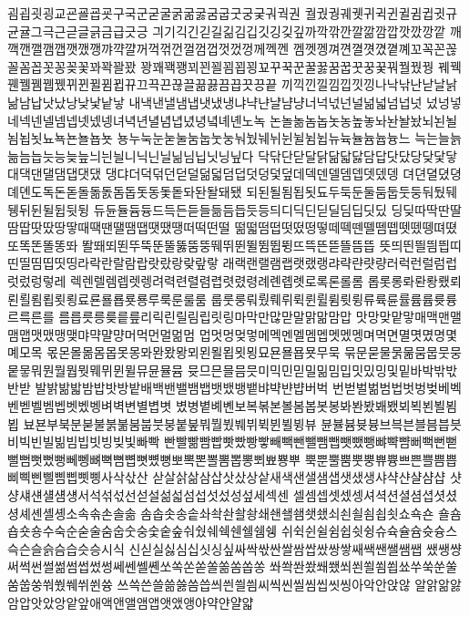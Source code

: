 굄굅굇굉교굔굘굡굣구국군굳굴굵굶굻굼굽굿궁궂궈궉권
궐궜궝궤궷귀귁귄귈귐귑귓규균귤그극근귿글긁금급긋긍
긔기긱긴긷길긺김깁깃깅깆깊까깍깎깐깔깖깜깝깟깠깡깥
깨깩깬깰깸깹깻깼깽꺄꺅꺌꺼꺽꺾껀껄껌껍껏껐껑께껙껜
껨껫껭껴껸껼꼇꼈꼍꼐꼬꼭꼰꼲꼴꼼꼽꼿꽁꽂꽃꽈꽉꽐꽜
꽝꽤꽥꽹꾀꾄꾈꾐꾑꾕꾜꾸꾹꾼꿀꿇꿈꿉꿋꿍꿎꿔꿜꿨꿩
꿰꿱꿴꿸뀀뀁뀄뀌뀐뀔뀜뀝뀨끄끅끈끊끌끎끓끔끕끗끙끝
끼끽낀낄낌낍낏낑나낙낚난낟날낡낢남납낫났낭낮낯낱낳
내낵낸낼냄냅냇냈냉냐냑냔냘냠냥너넉넋넌널넒넓넘넙넛
넜넝넣네넥넨넬넴넵넷넸넹녀녁년녈념녑녔녕녘녜녠노녹
논놀놂놈놉놋농높놓놔놘놜놨뇌뇐뇔뇜뇝뇟뇨뇩뇬뇰뇹뇻
뇽누눅눈눋눌눔눕눗눙눠눴눼뉘뉜뉠뉨뉩뉴뉵뉼늄늅늉느
늑는늘늙늚늠늡늣능늦늪늬늰늴니닉닌닐닒님닙닛닝닢다
닥닦단닫달닭닮닯닳담답닷닸당닺닻닿대댁댄댈댐댑댓댔
댕댜더덕덖던덛덜덞덟덤덥덧덩덫덮데덱덴델뎀뎁뎃뎄뎅
뎌뎐뎔뎠뎡뎨뎬도독돈돋돌돎돐돔돕돗동돛돝돠돤돨돼됐
되된될됨됩됫됴두둑둔둘둠둡둣둥둬뒀뒈뒝뒤뒨뒬뒵뒷뒹
듀듄듈듐듕드득든듣들듦듬듭듯등듸디딕딘딛딜딤딥딧딨
딩딪따딱딴딸땀땁땃땄땅땋때땍땐땔땜땝땟땠땡떠떡떤떨
떪떫떰떱떳떴떵떻떼떽뗀뗄뗌뗍뗏뗐뗑뗘뗬또똑똔똘똥똬
똴뙈뙤뙨뚜뚝뚠뚤뚫뚬뚱뛔뛰뛴뛸뜀뜁뜅뜨뜩뜬뜯뜰뜸뜹
뜻띄띈띌띔띕띠띤띨띰띱띳띵라락란랄람랍랏랐랑랒랖랗
래랙랜랠램랩랫랬랭랴략랸럇량러럭런럴럼럽럿렀렁렇레
렉렌렐렘렙렛렝려력련렬렴렵렷렸령례롄롑롓로록론롤롬
롭롯롱롸롼뢍뢨뢰뢴뢸룀룁룃룅료룐룔룝룟룡루룩룬룰룸
룹룻룽뤄뤘뤠뤼뤽륀륄륌륏륑류륙륜률륨륩륫륭르륵른를
름릅릇릉릊릍릎리릭린릴림립릿링마막만많맏말맑맒맘맙
맛망맞맡맣매맥맨맬맴맵맷맸맹맺먀먁먈먕머먹먼멀멂멈
멉멋멍멎멓메멕멘멜멤멥멧멨멩며멱면멸몃몄명몇몌모목
몫몬몰몲몸몹못몽뫄뫈뫘뫙뫼묀묄묍묏묑묘묜묠묩묫무묵
묶문묻물묽묾뭄뭅뭇뭉뭍뭏뭐뭔뭘뭡뭣뭬뮈뮌뮐뮤뮨뮬뮴
뮷므믄믈믐믓미믹민믿밀밂밈밉밋밌밍및밑바박밖밗반받
발밝밞밟밤밥밧방밭배백밴밸뱀뱁뱃뱄뱅뱉뱌뱍뱐뱝버벅
번벋벌벎범법벗벙벚베벡벤벧벨벰벱벳벴벵벼벽변별볍볏
볐병볕볘볜보복볶본볼봄봅봇봉봐봔봤봬뵀뵈뵉뵌뵐뵘뵙
뵤뵨부북분붇불붉붊붐붑붓붕붙붚붜붤붰붸뷔뷕뷘뷜뷩뷰
뷴뷸븀븃븅브븍븐블븜븝븟비빅빈빌빎빔빕빗빙빚빛빠빡
빤빨빪빰빱빳빴빵빻빼빽뺀뺄뺌뺍뺏뺐뺑뺘뺙뺨뻐뻑뻔뻗
뻘뻠뻣뻤뻥뻬뼁뼈뼉뼘뼙뼛뼜뼝뽀뽁뽄뽈뽐뽑뽕뾔뾰뿅뿌
뿍뿐뿔뿜뿟뿡쀼쁑쁘쁜쁠쁨쁩삐삑삔삘삠삡삣삥사삭삯산
삳살삵삶삼삽삿샀상샅새색샌샐샘샙샛샜생샤샥샨샬샴샵
샷샹섀섄섈섐섕서석섞섟선섣설섦섧섬섭섯섰성섶세섹센
셀셈셉셋셌셍셔셕션셜셤셥셧셨셩셰셴셸솅소속솎손솔솖
솜솝솟송솥솨솩솬솰솽쇄쇈쇌쇔쇗쇘쇠쇤쇨쇰쇱쇳쇼쇽숀
숄숌숍숏숑수숙순숟술숨숩숫숭숯숱숲숴쉈쉐쉑쉔쉘쉠쉥
쉬쉭쉰쉴쉼쉽쉿슁슈슉슐슘슛슝스슥슨슬슭슴습슷승시식
신싣실싫심십싯싱싶싸싹싻싼쌀쌈쌉쌌쌍쌓쌔쌕쌘쌜쌤쌥
쌨쌩썅써썩썬썰썲썸썹썼썽쎄쎈쎌쏀쏘쏙쏜쏟쏠쏢쏨쏩쏭
쏴쏵쏸쐈쐐쐤쐬쐰쐴쐼쐽쑈쑤쑥쑨쑬쑴쑵쑹쒀쒔쒜쒸쒼쓩
쓰쓱쓴쓸쓺쓿씀씁씌씐씔씜씨씩씬씰씸씹씻씽아악안앉않
알앍앎앓암압앗았앙앝앞애액앤앨앰앱앳앴앵야약얀얄얇
